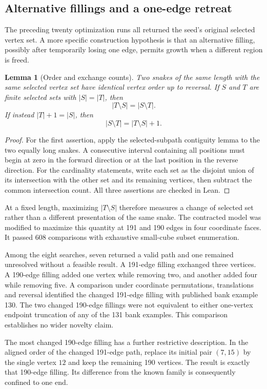 \documentclass[11pt,a4paper]{article}
\newtheorem{lemma}[theorem]{Lemma}
\theoremstyle{definition}
\theoremstyle{remark}
\begin{document}
\subsection{Alternative fillings and a one-edge retreat}
The preceding twenty optimization runs all returned the seed's original selected vertex set. A more specific construction hypothesis is that an alternative filling, possibly after temporarily losing one edge, permits growth when a different region is freed.

\begin{lemma}[Order and exchange counts]
Two snakes of the same length with the same selected vertex set have identical vertex order up to reversal. If $S$ and $T$ are finite selected sets with $|S|=|T|$, then
\[
|T\setminus S|=|S\setminus T|.
\]
If instead $|T|+1=|S|$, then
\[
|S\setminus T|=|T\setminus S|+1.
\]
\end{lemma}
\begin{proof}
For the first assertion, apply the selected-subpath contiguity lemma to the two equally long snakes. A consecutive interval containing all positions must begin at zero in the forward direction or at the last position in the reverse direction. For the cardinality statements, write each set as the disjoint union of its intersection with the other set and its remaining vertices, then subtract the common intersection count. All three assertions are checked in Lean.
\end{proof}

At a fixed length, maximizing $|T\setminus S|$ therefore measures a change of selected set rather than a different presentation of the same snake. The contracted model was modified to maximize this quantity at 191 and 190 edges in four coordinate faces. It passed 608 comparisons with exhaustive small-cube subset enumeration.

Among the eight searches, seven returned a valid path and one remained unresolved without a feasible result. A 191-edge filling exchanged three vertices. A 190-edge filling added one vertex while removing two, and another added four while removing five. A comparison under coordinate permutations, translations and reversal identified the changed 191-edge filling with published bank example 130. The two changed 190-edge fillings were not equivalent to either one-vertex endpoint truncation of any of the 131 bank examples. This comparison establishes no wider novelty claim.

The most changed 190-edge filling has a further restrictive description. In the aligned order of the changed 191-edge path, replace its initial pair $(7,15)$ by the single vertex $12$ and keep the remaining 190 vertices. The result is exactly that 190-edge filling. Its difference from the known family is consequently confined to one end.
\end{document}
